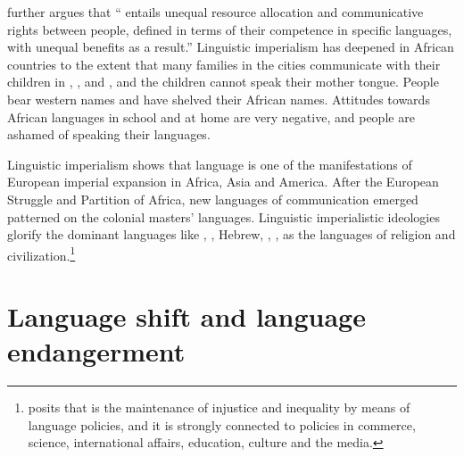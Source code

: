 \documentclass[output=paper,
modfonts
]{langscibook}
\begin{document}
\citet[780]{Phillipson2009} further argues that “ entails unequal resource allocation and communicative rights between people, defined in terms of their competence in specific languages, with unequal benefits as a result.” Linguistic imperialism has deepened in African countries to the extent that many families in the cities communicate with their children in , ,  and , and the children cannot speak their mother tongue. People bear western names and have shelved their African names. Attitudes towards African languages in school and at home are very negative, and people are ashamed of speaking their languages.

Linguistic imperialism shows that language is one of the manifestations of European imperial expansion in Africa, Asia and  America. After the European Struggle and Partition of Africa, new languages of communication emerged patterned on the colonial masters’ languages. Linguistic imperialistic ideologies glorify the dominant languages like , , Hebrew, , , as the languages of religion and civilization.\footnote{\citet[782]{Phillipson2009} posits that  is the maintenance of injustice and inequality by means of language policies, and it is strongly connected to policies in commerce, science, international affairs, education, culture and the media. }

\section{Language shift and language endangerment}
\end{document}
